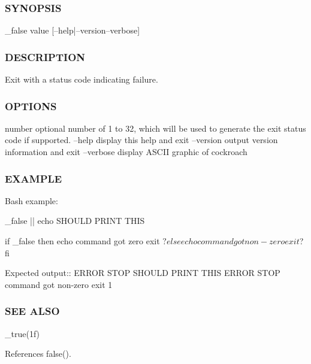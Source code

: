 \subsubsection*{S\+Y\+N\+O\+P\+S\+IS}

\begin{DoxyVerb}    _false value [--help|--version--verbose]
\end{DoxyVerb}


\subsubsection*{D\+E\+S\+C\+R\+I\+P\+T\+I\+ON}

Exit with a status code indicating failure. \subsubsection*{O\+P\+T\+I\+O\+NS}

number optional number of 1 to 32, which will be used to generate the exit status code if supported. --help display this help and exit --version output version information and exit --verbose display A\+S\+C\+II graphic of cockroach

\subsubsection*{E\+X\+A\+M\+P\+LE}

\begin{DoxyVerb}   Bash example:

      _false || echo SHOULD PRINT THIS

      if _false
      then
         echo command got zero exit $?
      else
         echo command got non-zero exit $?
      fi

   Expected output::
      ERROR STOP
      SHOULD PRINT THIS
      ERROR STOP
      command got non-zero exit 1
\end{DoxyVerb}


\subsubsection*{S\+EE A\+L\+SO}

\+\_\+true(1f) 

References false().

